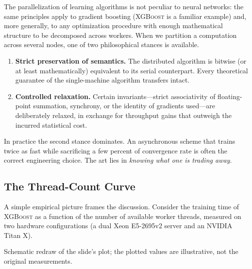 \documentclass[11pt,a4paper]{article}
\theoremstyle{definition}
\theoremstyle{remark}
\theoremstyle{plain}
\begin{document}
The parallelization of learning algorithms is not peculiar to neural
networks: the same principles apply to gradient boosting
(\textsc{XGBoost} is a familiar example) and, more generally, to any
optimization procedure with enough mathematical structure to be
decomposed across workers. When we partition a computation across several
nodes, one of two philosophical stances is available.

\begin{enumerate}[label=(\roman*), leftmargin=2em, itemsep=2pt]
  \item \textbf{Strict preservation of semantics.} The distributed
        algorithm is bitwise (or at least mathematically) equivalent to
        its serial counterpart. Every theoretical guarantee of the
        single-machine algorithm transfers intact.
  \item \textbf{Controlled relaxation.} Certain invariants---strict
        associativity of floating-point summation, synchrony, or the
        identity of gradients used---are deliberately relaxed, in
        exchange for throughput gains that outweigh the incurred
        statistical cost.
\end{enumerate}

In practice the second stance dominates. An asynchronous scheme that
trains twice as fast while sacrificing a few percent of convergence rate
is often the correct engineering choice. The art lies in \emph{knowing
what one is trading away}.

\subsection{The Thread-Count Curve}

A simple empirical picture frames the discussion. Consider the training
time of \textsc{XGBoost} as a function of the number of available worker
threads, measured on two hardware configurations (a dual Xeon E5-2695v2
server and an NVIDIA Titan X).

\begin{center}
\par\smallskip
{\small Schematic redraw of the slide's plot; the plotted values are
illustrative, not the original measurements.}
\end{center}
\end{document}
